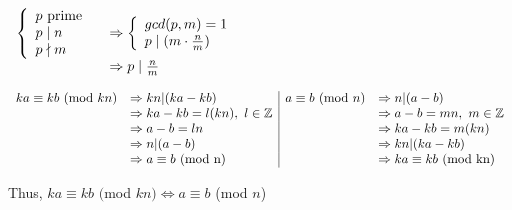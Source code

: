 \documentclass[a4paper, 11pt]{article}
\begin{document}
\begin{myEnumerate}
\begin{myEnumerate}
        \item
        \( \\
        \begin{array}{ll}
        	\left\{
    			\begin{array}{l}
        			p $ prime $ \\
        			p \mid n \\
                    p \nmid m
    			\end{array}
			\right.
            & \Rightarrow 
            \left\{
    			\begin{array}{l}
        			gcd(p, m) = 1 \\
        			p \mid (m \cdot \frac{n}{m})
    			\end{array}
			\right.\\
            & \Rightarrow p \mid \frac{n}{m}
        \end{array} \\ \)

    \end{myEnumerate}

    \item
    \begin{myEnumerate}
    	\item
        \( \\
        \begin{array}{ll|ll}
            	ka \equiv kb \textnormal{ (mod $kn$)} &  \Rightarrow kn|(ka - kb)
                & a \equiv b \textnormal{ (mod $n$)}  &  \Rightarrow n|(a - b) \\
                									  &  \Rightarrow ka - kb = l(kn), \textnormal{ } l\in \mathbb{Z}
                                                      && \Rightarrow a - b = mn, \textnormal{ } m\in \mathbb{Z} \\
                									  &  \Rightarrow a - b = ln 
                                                      && \Rightarrow ka - kb = m(kn) \\
                									  &  \Rightarrow n|(a - b) 
                                                      && \Rightarrow kn|(ka - kb) \\
                									  &  \Rightarrow a \equiv b \textnormal{ (mod n)}
                                                      && \Rightarrow ka \equiv kb \textnormal{ (mod kn)}
        \end{array} \\ \)
        
        Thus, $ka \equiv kb $ $ ($mod $ kn) \Leftrightarrow a \equiv b$ (mod $n$) \\
        

\end{myEnumerate}
\end{myEnumerate}
\end{document}
